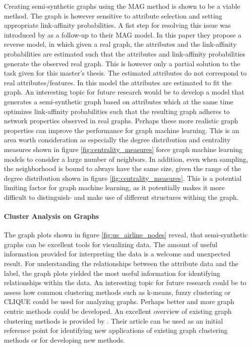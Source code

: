   \noindent Creating semi-synthetic graphs using the MAG method is shown to be a 
  viable method. The graph is however sensitive to attribute selection and 
  setting appropriate link-affinity probabilities. A fist step for resolving
  this issue was introduced by \cite{kim2011modeling} as a follow-up to their
  MAG model. In this paper they propose a reverse model, in which given a real
  graph, the attributes and the link-affinity probabilities are estimated such 
  that the attributes and link-affinity probabilities generate the observed real
  graph. This is however only a partial solution to the task given for this
  master's thesis. The estimated attributes do not correspond to real 
  attributes/features. In this model the attributes are estimated to fit the 
  graph. An interesting topic for future research would be to develop a model 
  that generates a semi-synthetic graph based on attributes which at the same
  time optimizes link-affinity probabilities such that the resulting graph
  adheres to network properties observed in real graphs. Perhaps these more
  realistic graph properties can improve the performance for graph machine
  learning. This is an area worth consideration as especially the degree
  distribution and centrality measures shown in figure 
  \ref{fig:centrality_measures} force graph machine learning models to consider
  a large number of neighbors. In addition, even when sampling, the
  neighborhood is bound to always have the same size, given the range of the
  degree distribution shown in figure \ref{fig:centrality_measures}. This is a
  potential limiting factor for graph machine learning, as it potentially makes
  it more difficult to distinguish- and make use of different structures
  withing the graph.

  \paragraph{Cluster Analysis on Graphs} \mbox{}

  \noindent The graph plots shown in figure \ref{fig:us_airline_nodes} reveal,
  that semi-synthetic graphs can be excellent tools for visualizing data. The
  amount of useful information provided for interpreting the data is a welcome
  and unexpected result. For understanding the relationships between the
  attribute data and the label, the graph plots yielded the most useful
  information for identifying relationships within the data. An interesting
  topic for future research could be to assess how common clustering methods
  such as k-means, fuzzy clustering or CLIQUE could be used for analyzing
  graphs. Perhaps better and more graph centric methods could be developed. An
  excellent overview of existing graph clustering methods is provided by
  \cite{zhou2020graph}. Their article can be used as an initial reference point
  for identifying new applications of existing graph clustering methods or for 
  developing new methods.

